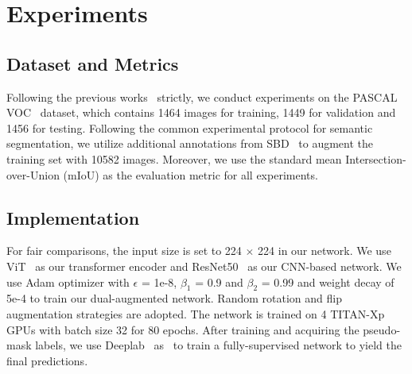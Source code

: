 \documentclass[journal]{IEEEtran}
\begin{document}
\section{Experiments}

\subsection{Dataset and Metrics}
Following the previous works~\cite{wang2020self,su2021context} strictly, we conduct experiments on the PASCAL VOC~\cite{everingham2010pascal} dataset, which contains 1464 images for training, 1449 for validation and 1456 for testing. Following the common experimental protocol for semantic segmentation, we utilize additional annotations from SBD~\cite{hariharan2011semantic} to augment the training set with 10582 images. Moreover, we use the standard mean Intersection-over-Union (mIoU) as the evaluation metric for all experiments.

\subsection{Implementation}
For fair comparisons, the input size is set to 224 $\times$ 224 in our network. We use ViT~\cite{dosovitskiy2020image} as our transformer encoder and ResNet50~\cite{he2016deep} as our CNN-based network. We use Adam optimizer with $\epsilon$ = 1e-8, $\beta_1$ = 0.9 and $\beta_2$ = 0.99 and weight decay of 5e-4 to train our dual-augmented network. Random rotation and flip augmentation strategies are adopted. The network is trained on 4 TITAN-Xp GPUs with batch size 32 for 80 epochs. After training and acquiring the pseudo-mask labels, we use Deeplab~\cite{chen2014semantic} as~\cite{wang2020self,su2021context} to train a fully-supervised network to yield the final predictions.

\begin{table}[]
	\begin{center}
	\end{center}\caption{Each component's accuracy in our proposed network on the PASCAL VOC 2012 training set in mIoU.}\label{table1}
\end{table}
\end{document}
